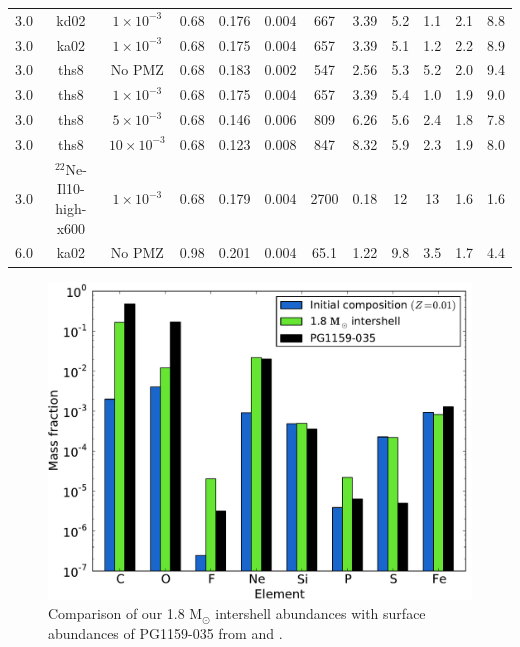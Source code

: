 \begin{table}[p!]
\begin{sideways}
\begin{minipage}{210mm}
\begin{tabular}{l c c c c c c c c c c c}
3.0			& kd02		& $1\times10^{-3}$			& 0.68					& 0.176	& 0.004	& 667	& 3.39	& 5.2	& 1.1	& 2.1	& 8.8\\
3.0			& ka02		& $1\times10^{-3}$			& 0.68					& 0.175	& 0.004	& 657	& 3.39	& 5.1	& 1.2	& 2.2	& 8.9\\
3.0			& ths8		& No PMZ				& 0.68					& 0.183	& 0.002	& 547	& 2.56	& 5.3	& 5.2	& 2.0	& 9.4\\
3.0			& ths8		& $1\times10^{-3}$			& 0.68					& 0.175	& 0.004	& 657	& 3.39	& 5.4	& 1.0	& 1.9	& 9.0\\
3.0			& ths8		& $5\times10^{-3}$ 			& 0.68					& 0.146	& 0.006	& 809	& 6.26	& 5.6	& 2.4	& 1.8	& 7.8\\
3.0			& ths8		& $10\times10^{-3}$		& 0.68					& 0.123	& 0.008	& 847	& 8.32	& 5.9	& 2.3	& 1.9	& 8.0\\
3.0			& $^{22}$Ne-Il10-high-x600	& $1\times10^{-3}$	& 0.68				& 0.179	& 0.004	& 2700	& 0.18	& 12		& 13		& 1.6	& 1.6\\
6.0			& ka02		& No PMZ				& 0.98					& 0.201	& 0.004	& 65.1	& 1.22	& 9.8	& 3.5	& 1.7	& 4.4\\
\hline
\end{tabular}
\end{minipage}\end{sideways}
\end{table}

\begin{figure}
 \begin{center}\includegraphics[width=\columnwidth]{figures/pg1159035modelnosolar}\end{center}
 \caption{Comparison of our 1.8 M$_\odot$ intershell abundances with surface abundances of PG1159-035 from \citet{Jahn:2007ip} and \citet{Werner:2011bl}.}\label{fig:pg1159035}
\end{figure}

